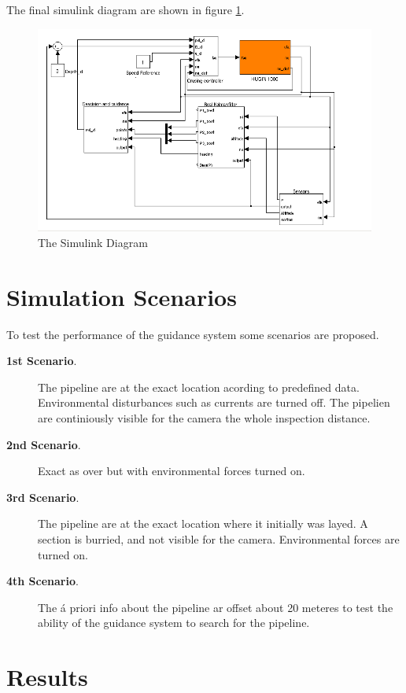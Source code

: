	The final simulink diagram are shown in figure \ref{fig:ch3_simulink}.
	\begin{figure}[htbp]
		\includegraphics[width=\textwidth]{pics/simulink}
		\caption{The Simulink Diagram}
		\label{fig:ch3_simulink}
	\end{figure}

	

\section{Simulation Scenarios}
	To test the performance of the guidance system some scenarios are proposed.
	\begin{description}
		\item[\textbf{1st Scenario}.] The pipeline are at the exact location acording to predefined
		data. Environmental disturbances such as currents are turned off. The pipelien are
		continiously visible for the camera the whole inspection distance.
		\item[\textbf{2nd Scenario}.] Exact as over but with environmental forces turned on.
		\item[\textbf{3rd Scenario}.] The pipeline are at the exact location where it initially was
		layed. A section is burried, and not visible for the camera. Environmental forces are turned
		on.
		\item[\textbf{4th Scenario}.] The á priori info about the pipeline ar offset about 20 meteres
		to test the ability of the guidance system to search for the pipeline.
	\end{description}


\section{Results}
	
	


